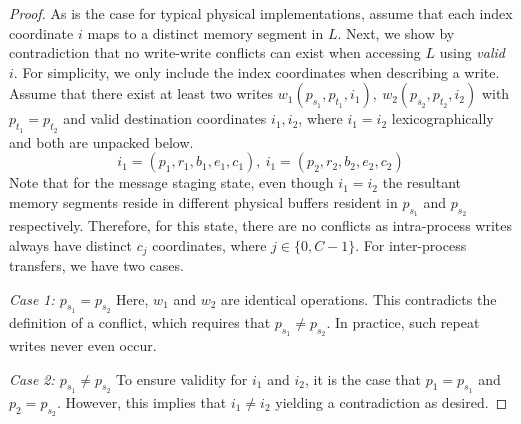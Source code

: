 \begin{proof}
    As is the case for typical physical implementations,
    assume that each index coordinate $i$ maps to a distinct memory segment in $L$.
    Next, we show by contradiction that no write-write conflicts can exist when accessing $L$ using \emph{valid} $i$.
    For simplicity, we only include the index coordinates when describing a write.
    Assume that there exist at least two writes $w_1(p_{s_1}, p_{t_1}, i_1),\>w_2(p_{s_2}, p_{t_2}, i_2)$
    with $p_{t_1} = p_{t_2}$ and valid destination coordinates
    $i_1, i_2$, where $i_1 = i_2$ lexicographically and both are unpacked below.
    \[
        i_1 = (p_1, r_1, b_1, e_1, c_1),\> i_1 = (p_2, r_2, b_2, e_2, c_2)
    \]
    Note that for the message staging state, even though $i_1 = i_2$ the resultant memory segments reside in
    different physical buffers resident in $p_{s_1}$ and $p_{s_2}$ respectively.
    Therefore, for this state, there are no conflicts as intra-process writes always have distinct $c_j$
    coordinates, where $j \in \{0, C - 1\}$.
    For inter-process transfers, we have two cases.

    \textit{Case 1: $p_{s_1} = p_{s_2}$}
    \newline Here, $w_1$ and $w_2$ are identical operations.
    This contradicts the definition of a conflict, which requires that $p_{s_1} \neq p_{s_2}$.
    In practice, such repeat writes never even occur.

    \textit{Case 2: $p_{s_1} \neq p_{s_2}$}
    \newline To ensure validity for $i_1$ and $i_2$, it is the case that $p_1 = p_{s_1}$ and $p_2 = p_{s_2}$.
    However, this implies that $i_1 \neq i_2$ yielding a contradiction as desired.
\end{proof}